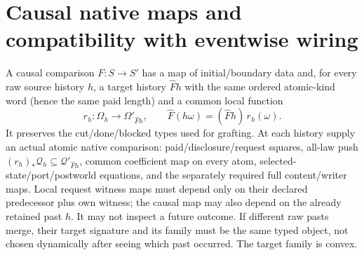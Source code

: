 \documentclass[11pt]{article}\usepackage{amsmath,amssymb,amsthm,geometry}\geometry{margin=1in}
\begin{document}
\section{Causal native maps and compatibility with eventwise wiring}
A causal comparison $F:S\to S'$ has a map of initial/boundary data and, for every raw source history $h$, a target history $\widehat Fh$ with the same ordered atomic-kind word (hence the same paid length) and a common local function
\[
 r_h:\Omega_h\longrightarrow\Omega'_{\widehat Fh},\qquad
 \widehat F(h\omega)=(\widehat Fh)\,r_h(\omega).                    \tag{5}
\]
It preserves the cut/done/blocked types used for grafting. At each history supply an actual atomic native comparison: paid/disclosure/request squares, all-law push
$(r_h)_*\mathcal Q_h\subseteq\mathcal Q'_{\widehat Fh}$, common coefficient map on every atom, selected-state/port/postworld equations, and the separately required full content/writer maps. Local request witness maps must depend only on their declared predecessor plus own witness; the causal map may also depend on the already retained past $h$. It may not inspect a future outcome. If different raw pasts merge, their target signature and its family must be the same typed object, not chosen dynamically after seeing which past occurred. The target family is convex.
\end{document}
